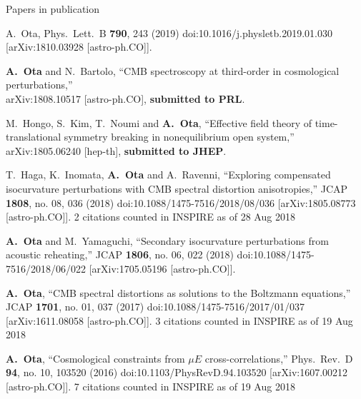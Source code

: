 \documentclass[a4paper]{resume} %
\begin{document}
\begin{rSection}{Papers in publication}


\begin{etaremune}

\item  
  A.~Ota,
  Phys.\ Lett.\ B {\bf 790}, 243 (2019)
  doi:10.1016/j.physletb.2019.01.030
  [arXiv:1810.03928 [astro-ph.CO]].
  

\item
  {\bf A.~Ota} and N.~Bartolo,
  ``CMB spectroscopy at third-order in cosmological perturbations,''\\
  arXiv:1808.10517 [astro-ph.CO], {\bf submitted to PRL}.
    \item 
      M.~Hongo, S.~Kim, T.~Noumi and {\bf A.~Ota},
  ``Effective field theory of time-translational symmetry breaking in nonequilibrium open system,''
  arXiv:1805.06240 [hep-th], {\bf submitted to JHEP}.


\item
  T.~Haga, K.~Inomata, {\bf A.~Ota} and A.~Ravenni,
  ``Exploring compensated isocurvature perturbations with CMB spectral distortion anisotropies,''
  JCAP {\bf 1808}, no. 08, 036 (2018)
  doi:10.1088/1475-7516/2018/08/036
  [arXiv:1805.08773 [astro-ph.CO]].
  2 citations counted in INSPIRE as of 28 Aug 2018
  
    \item 
  {\bf A.~Ota} and M.~Yamaguchi,
  ``Secondary isocurvature perturbations from acoustic reheating,''
  JCAP {\bf 1806}, no. 06, 022 (2018)
  doi:10.1088/1475-7516/2018/06/022
  [arXiv:1705.05196 [astro-ph.CO]].
  
    \item
  {\bf A.~Ota},
  ``CMB spectral distortions as solutions to the Boltzmann equations,''
  JCAP {\bf 1701}, no. 01, 037 (2017)
  doi:10.1088/1475-7516/2017/01/037
  [arXiv:1611.08058 [astro-ph.CO]].
  3 citations counted in INSPIRE as of 19 Aug 2018
  
    \item
  {\bf A.~Ota},
  ``Cosmological constraints from $\mu E$ cross-correlations,''
  Phys.\ Rev.\ D {\bf 94}, no. 10, 103520 (2016)
  doi:10.1103/PhysRevD.94.103520
  [arXiv:1607.00212 [astro-ph.CO]].
  7 citations counted in INSPIRE as of 19 Aug 2018


\end{etaremune}
\end{rSection}
\end{document}
